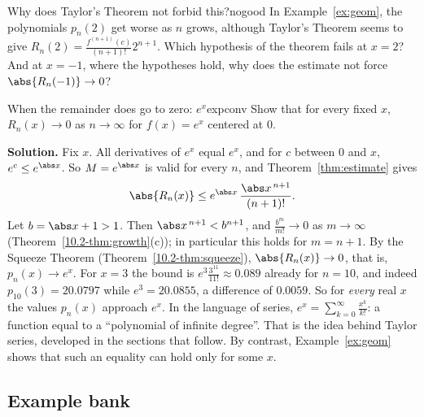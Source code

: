 \documentclass[11pt]{article}
\begin{document}
\begin{think}{Why does Taylor's Theorem not forbid this?}{nogood}
In Example~\ref{ex:geom}, the polynomials $p_n(2)$ get worse as $n$ grows, although Taylor's Theorem seems to give $R_n(2)=\frac{f^{(n+1)}(c)}{(n+1)!}2^{n+1}$. Which hypothesis of the theorem fails at $x=2$? And at $x=-1$, where the hypotheses hold, why does the estimate not force $\abs{R_n(-1)}\to0$?
\end{think}

\begin{exmp}{When the remainder does go to zero: $e^x$}{expconv}
Show that for every fixed $x$, $R_n(x)\to0$ as $n\to\infty$ for $f(x)=e^x$ centered at $0$.

\textbf{Solution.} Fix $x$. All derivatives of $e^x$ equal $e^x$, and for $c$ between $0$ and $x$, $e^c\le e^{\abs x}$. So $M=e^{\abs x}$ is valid for every $n$, and Theorem~\ref{thm:estimate} gives
\[
\abs{R_n(x)}\le e^{\abs x}\,\frac{\abs x^{\,n+1}}{(n+1)!}.
\]
Let $b=\abs x+1>1$. Then $\abs x^{\,n+1}<b^{n+1}$, and $\frac{b^m}{m!}\to0$ as $m\to\infty$ (Theorem~\ref{10.2-thm:growth}(c)); in particular this holds for $m=n+1$. By the Squeeze Theorem (Theorem~\ref{10.2-thm:squeeze}), $\abs{R_n(x)}\to0$, that is, $p_n(x)\to e^x$. For $x=3$ the bound is $e^3\frac{3^{11}}{11!}\approx0.089$ already for $n=10$, and indeed $p_{10}(3)=20.0797$ while $e^3=20.0855$, a difference of $0.0059$.
So for \emph{every} real $x$ the values $p_n(x)$ approach $e^x$. In the language of series, $e^x=\sum_{k=0}^\infty\frac{x^k}{k!}$: a function equal to a ``polynomial of infinite degree''. That is the idea behind Taylor series, developed in the sections that follow. By contrast, Example~\ref{ex:geom} shows that such an equality can hold only for some $x$.
\end{exmp}

\subsection*{Example bank}
\end{document}
